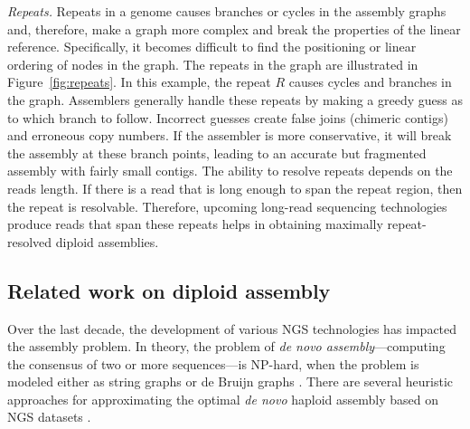 \textit{Repeats.} Repeats in a genome causes branches or cycles in the assembly graphs and, therefore, make a graph more complex and break the properties of the linear reference.
Specifically, it becomes difficult to find the positioning or linear ordering of nodes in the graph.
The repeats in the graph are illustrated in Figure~\ref{fig:repeats}. In this example, the repeat $R$ causes cycles and branches in the graph.
Assemblers generally handle these repeats by making a greedy guess as to which branch to follow.
Incorrect guesses create false joins (chimeric contigs) and erroneous copy numbers. 
If the assembler is more conservative, it will break the assembly at these branch points, leading to an accurate but fragmented assembly with fairly small contigs.
The ability to resolve repeats depends on the reads length. If there is a read that is long enough to span the repeat region, then the repeat is resolvable.
Therefore, upcoming long-read sequencing technologies produce reads that span these repeats helps in obtaining maximally repeat-resolved diploid assemblies.

\subsection{Related work on diploid assembly}
Over the last decade, the development of various NGS technologies has impacted the assembly problem.
\vspace{10cm}
In theory, the problem of \textit{de novo assembly}---computing the consensus of two or more sequences---is NP-hard, when the problem is modeled either as string graphs or de Bruijn graphs \citep{medvedev2007computability}. 
There are several heuristic approaches for approximating the optimal \textit{de novo} haploid assembly based on NGS datasets \citep{idury1995new, myers1995toward, myers2005fragment, pevzner2001eulerian, nagarajan2009parametric, nagarajan2013sequence, sovic2013approaches}.

